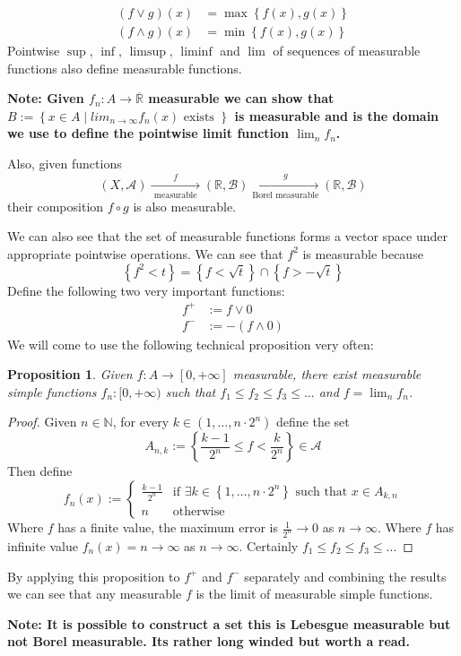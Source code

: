 \documentclass[11pt]{article}
\newcommand{\defeq}{:=}
\newcommand{\relmiddle}[1]{\mathrel{}\middle#1\mathrel{}}
\newcommand{\rmv}{\relmiddle|}
\newcommand{\R}{\mathbb{R}}
\newcommand{\Rb}{\overline{\R}}
\newcommand{\N}{\mathbb{N}}
\newenvironment{note}
	{\begin{mdframed}[backgroundcolor=white, linecolor=red, roundcorner=5pt, linewidth=1pt]\bfseries{Note:}\normalfont}
	{\end{mdframed}}
\newtheorem{prop}[theorem]{Proposition}
\begin{document}
\begin{align*}
	(f\vee g)(x)  &=\max\left\{f(x), g(x)\right\}\\
	(f\wedge g)(x)&=\min\left\{f(x), g(x)\right\}
\end{align*}
Pointwise $\sup$, $\inf$, $\limsup$, $\liminf$ and $\lim$ of sequences of measurable functions also define measurable functions.
\begin{note}
	Given $f_n:A\to\Rb$ measurable we can show that $B\defeq\left\{x\in A \rmv lim_{n\to\infty} f_n(x)\text{ exists }\right\}$ is measurable and is the domain we use to define the pointwise limit function $\lim_n f_n$.

	Also, given functions
	\[
		(X, \mathcal{A})\xrightarrow[\text{ measurable }]{f}(\R, \mathcal{B})\xrightarrow[\text{Borel measurable}]{g}(\R, \mathcal{B})
	\]
	their composition $f\circ g$ is also measurable.
\end{note}
We can also see that the set of measurable functions forms a vector space under appropriate pointwise operations.
We can see that $f^2$ is measurable because
\[
	\left\{f^2 < t\right\}=\left\{ f < \sqrt{t} \right\} \cap \left\{ f > - \sqrt{t} \right\}
\]
Define the following two very important functions:
\begin{align*}
	f^+&\defeq f\vee 0 \\
	f^-&\defeq -\left(f \wedge 0\right)
\end{align*}
We will come to use the following technical proposition very often:
\begin{prop}
	Given $f:A\to[0, +\infty]$ measurable, there exist measurable simple functions $f_n:[0,+\infty)$ such that $f_1\leq f_2\leq f_3\leq ...$ and $f=\lim_n f_n$.
\end{prop}
\begin{proof}
Given $n\in\N$, for every $k\in\left(1,\dots, n\cdot 2^n \right)$ define the set
\[
	A_{n,k}\defeq\left\{\frac{k-1}{2^n}\leq f < \frac{k}{2^n}\right\}\in\mathcal{A}
\]
Then define
\[
	f_n(x)\defeq
	\begin{cases}
		\frac{k-1}{2^n}	&\text{if }\exists k\in\left\{1,\dots, n \cdot 2^n \right\}\text{ such that }x\in A_{k, n}\\
		n				&\text{otherwise}
	\end{cases}
\]
Where $f$ has a finite value, the maximum error is $\frac{1}{2^n}\to 0$ as $n\to\infty$.
Where $f$ has infinite value $f_n(x)=n\to\infty$ as $n\to\infty$.
Certainly $f_1\leq f_2 \leq f_3 \leq \dots$
\end{proof}
By applying this proposition to $f^+$ and $f^-$ separately and combining the results we can see that any measurable $f$ is the limit of measurable simple functions.
\begin{note}
It is possible to construct a set this is Lebesgue measurable but not Borel measurable.
Its rather long winded but worth a read.
\end{note}
\end{document}
